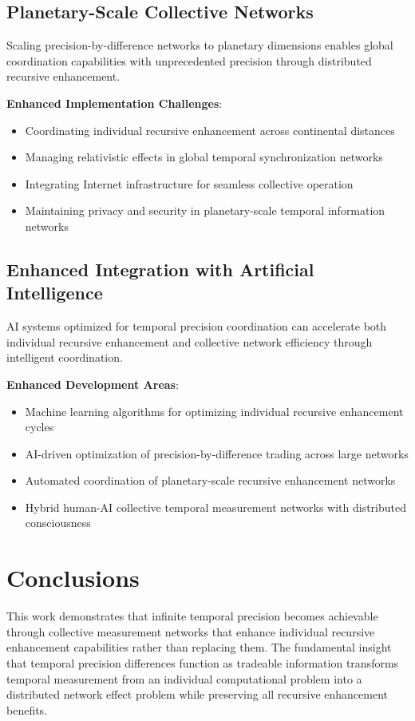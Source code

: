 \documentclass[12pt,a4paper]{article}
\begin{document}
\subsection{Planetary-Scale Collective Networks}

Scaling precision-by-difference networks to planetary dimensions enables global coordination capabilities with unprecedented precision through distributed recursive enhancement.

\textbf{Enhanced Implementation Challenges}:
\begin{itemize}
\item Coordinating individual recursive enhancement across continental distances
\item Managing relativistic effects in global temporal synchronization networks
\item Integrating Internet infrastructure for seamless collective operation
\item Maintaining privacy and security in planetary-scale temporal information networks
\end{itemize}

\subsection{Enhanced Integration with Artificial Intelligence}

AI systems optimized for temporal precision coordination can accelerate both individual recursive enhancement and collective network efficiency through intelligent coordination.

\textbf{Enhanced Development Areas}:
\begin{itemize}
\item Machine learning algorithms for optimizing individual recursive enhancement cycles
\item AI-driven optimization of precision-by-difference trading across large networks
\item Automated coordination of planetary-scale recursive enhancement networks
\item Hybrid human-AI collective temporal measurement networks with distributed consciousness
\end{itemize}

\section{Conclusions}

This work demonstrates that infinite temporal precision becomes achievable through collective measurement networks that enhance individual recursive enhancement capabilities rather than replacing them. The fundamental insight that temporal precision differences function as tradeable information transforms temporal measurement from an individual computational problem into a distributed network effect problem while preserving all recursive enhancement benefits.
\end{document}
